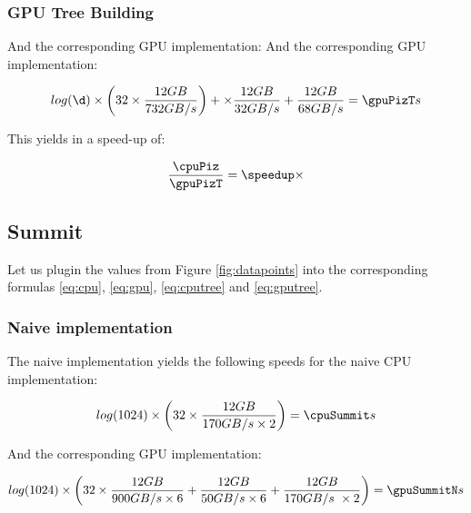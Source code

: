 \documentclass[]{article}
\begin{document}
\subsubsection{GPU Tree Building}

And the corresponding GPU implementation:
\pgfmathsetmacro{}
And the corresponding GPU implementation:
\begin{center}
	\begin{equation}
		log(\d) \times \left ( \p \times \frac{\s GB}{732 GB/s} \right ) + \times \frac{\s GB}{32 GB/s}  + \frac{\s GB}{68 GB/s} = \gpuPizT s
	\end{equation}
\end{center}

This yields in a speed-up of:
\pgfmathsetmacro\speedup{\cpuPiz / \gpuPizT}
\begin{center}
	\begin{equation}
		\frac{\cpuPiz}{\gpuPizT} = \speedup \times
	\end{equation}
\end{center}

\vspace{5mm}


\subsection{Summit}

Let us plugin the values from Figure \ref{fig:datapoints} into the corresponding formulas \ref{eq:cpu}, \ref{eq:gpu}, \ref{eq:cputree} and \ref{eq:gputree}.

\subsubsection{Naive implementation}
The naive implementation yields the following speeds for the naive CPU  implementation:

\pgfmathsetmacro{}
\begin{center}
	\begin{equation}
		log(1024) \times \left ( \p \times \frac{ \s GB }{170 GB/s \times 2} \right ) = \cpuSummit s
	\end{equation}
\end{center}

And the corresponding GPU implementation:
\pgfmathsetmacro{}
\begin{center}
	\begin{equation}
		log(1024) \times \left ( \p \times \frac{\s GB}{900 GB/s \times 6} + \frac{\s GB}{50 GB/s \times 6}  + \frac{\s GB}{170 GB/s \ \times 2} \right )= \gpuSummitN s
	\end{equation}
\end{center}
\end{document}
